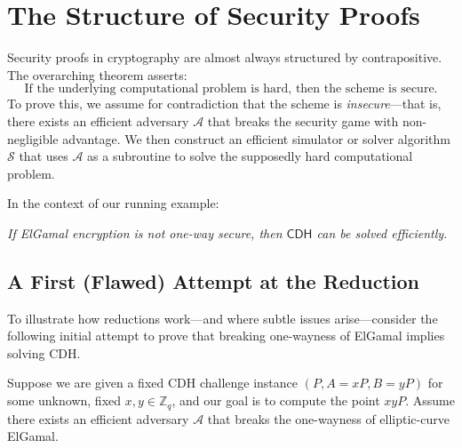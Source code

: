 \section*{The Structure of Security Proofs}

Security proofs in cryptography are almost always structured by contrapositive.
The overarching theorem asserts:
\[
    \text{If the underlying computational problem is hard, then the scheme is secure.}
\]
To prove this, we assume for contradiction that the scheme is \emph{insecure}---that is, there exists an efficient adversary \(\mathcal{A}\) that breaks the security game with non-negligible advantage.
We then construct an efficient simulator or solver algorithm \(\mathcal{S}\) that uses \(\mathcal{A}\) as a subroutine to solve the supposedly hard computational problem.

In the context of our running example:
\begin{center}
    \emph{If ElGamal encryption is not one-way secure, then \(\mathsf{CDH}\) can be solved efficiently.}
\end{center}

\subsection*{A First (Flawed) Attempt at the Reduction}

To illustrate how reductions work---and where subtle issues arise---consider the following initial attempt to prove that breaking one-wayness of ElGamal implies solving CDH.

Suppose we are given a fixed CDH challenge instance \((P, A = xP, B = yP)\) for some unknown, fixed \(x, y \in \mathbb{Z}_q\), and our goal is to compute the point \(xyP\).
Assume there exists an efficient adversary \(\mathcal{A}\) that breaks the one-wayness of elliptic-curve ElGamal.

